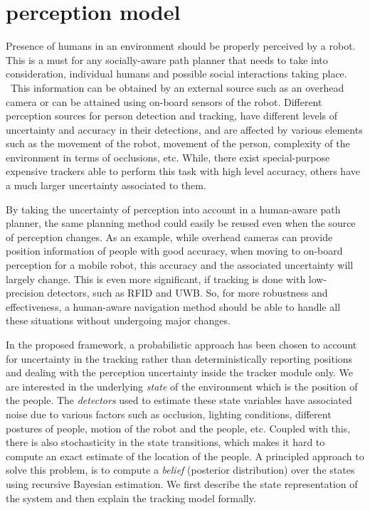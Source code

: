 \section{perception model}
\label{perception_model}


Presence of humans in an environment should be properly perceived by a robot. This is a must for any socially-aware path planner that needs to take into consideration, individual humans and possible social interactions taking place.%
~This information can be obtained by an external source such as an overhead camera or can be attained using on-board sensors of the robot. Different perception sources for person detection and tracking, have different levels of uncertainty and accuracy in their detections, and are affected by various elements such as the movement of the robot, movement of the person, complexity of the environment in terms of occlusions, etc. While, there exist special-purpose expensive trackers able to perform this task with high level accuracy, others have a much larger uncertainty associated to them. 

By taking the uncertainty of perception into account in a human-aware path planner, the same planning method could easily be reused even when the source of perception changes. As an example, while overhead cameras can provide position information of people with good accuracy, when moving to on-board perception for a mobile robot, this accuracy and the associated uncertainty will largely change. This is even more significant, if tracking is done with low-precision detectors, such as RFID and UWB. So, for more robustness and effectiveness, a human-aware navigation method should be able to handle all these situations without undergoing major changes.

In the proposed framework, a probabilistic approach has been chosen to account for uncertainty in the tracking rather than deterministically reporting positions and dealing with the perception uncertainty inside the tracker module only. We are interested in the underlying \textit{state} of the environment which is the position of the people. The \textit{detectors} used to estimate these state variables have associated noise due to various factors such as occlusion, lighting conditions, different postures of people, motion of the robot and the people, etc. Coupled with this, there is also stochasticity in the state transitions, which makes it hard to compute an exact estimate of the location of the people. A principled approach to solve this problem, is to compute a \textit{belief} (posterior distribution) over the states using recursive Bayesian estimation. We first describe the state representation of the system and then explain the tracking model formally.

